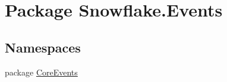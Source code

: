 \hypertarget{namespace_snowflake_1_1_events}{}\section{Package Snowflake.\+Events}
\label{namespace_snowflake_1_1_events}
\subsection*{Namespaces}
\begin{DoxyCompactItemize}
\item 
package \hyperlink{namespace_snowflake_1_1_events_1_1_core_events}{Core\+Events}
\end{DoxyCompactItemize}
